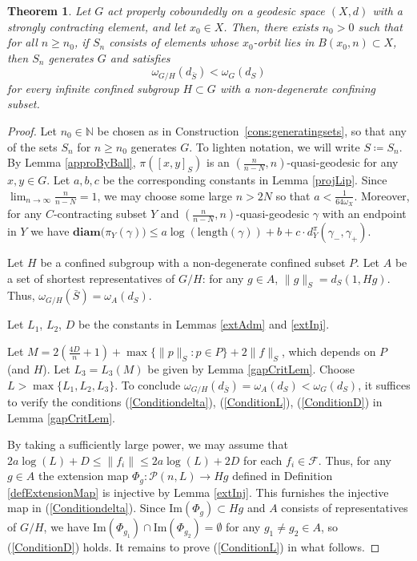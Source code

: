 \documentclass{amsart}
\newtheorem{thm}{Theorem}
\numberwithin{thm}{section}
\numberwithin{figure}{section}
\theoremstyle{definition}
\theoremstyle{definition}
\theoremstyle{remark}
\newcommand{\diam }[1]{{\textbf{diam}\big(#1\big)}}
\numberwithin{equation}{section}
\theoremstyle{plain}
\begin{document}
\begin{thm}\label{thm:main_growth}
Let $G$ act properly coboundedly on a geodesic space $(X,d)$ with a strongly contracting element, and let $x_0 \in X$. Then, there exists $n_0 > 0$ such that for all $n \geq n_0$, if $S_n$ consists of elements whose $x_0$-orbit lies in $B(x_0,n) \subset X$, then $S_n$ generates $G$ and satisfies 
\[
\omega_{G/H}(d_{\bar{S}}) < \omega_G(d_S)
\]
for \emph{every} infinite confined subgroup $H \subset G$ with a non-degenerate confining subset.
\end{thm}
\begin{proof}
    Let $n_0 \in \mathbb{N}$ be chosen as in Construction~\ref{cons:generatingsets}, so that any of the sets $S_n$ for $n \geq n_0$ generates $G$.
    To lighten notation, we will  write $S \coloneqq S_n$.
	By Lemma \ref{approByBall}, $\pi([x, y]_S)$ is an $(\frac{n}{n-N}, n)$-quasi-geodesic for any $x,y\in G$.  Let $a, b, c$ be the corresponding constants in Lemma \ref{projLip}. Since $\lim_{n\to \infty} \frac{n}{n-N} = 1$, we may choose    some large $n > 2N$ so that   $a < \frac{1}{64\omega_X}$. Moreover, for any $C$-contracting subset $Y$ and $(\frac{n}{n-N}, n)$-quasi-geodesic $\gamma$ with an endpoint in $Y$ we have $\diam{\pi_Y(\gamma)} \le a \log(\mathrm{length}(\gamma)) + b + c \cdot d^{\pi}_Y(\gamma_-, \gamma_+)$.
	
	Let $H$ be a confined subgroup with a non-degenerate confined subset $P$. Let $A$ be a set of shortest representatives of $G/H$: for any $g\in A$, $\|g\|_S=d_S(1,Hg)$. Thus, $\omega_{G/H}(\bar{S}) = \omega_A(d_{S})$. 
	
	Let $L_1$, $L_2$, $D$ be the constants in Lemmas \ref{extAdm} and \ref{extInj}.
	
	Let $M = 2(\frac{4D}{n} + 1) + \max\{\|p\|_S:p\in P\} + 2\|f\|_S$, which depends on $P$ (and $H$). 
	Let $L_3 =L_3(M)$ be given by Lemma \ref{gapCritLem}. Choose $L > \max\{L_1, L_2, L_3\}$. To conclude  $\omega_{G/H}(d_{\bar{S}}) = \omega_A(d_{S}) < \omega_G(d_{S})$, it suffices to verify the conditions (\ref{Conditiondelta}), (\ref{ConditionL}), (\ref{ConditionD}) in Lemma \ref{gapCritLem}.
	
	By taking a sufficiently large power, we may assume that $2a \log(L) + D \le \|f_i\| \le 2a \log(L) + 2D$ for each $f_i\in \mathcal{F}$.
	Thus, for any $g\in A$  the extension map $\Phi_g: \mathcal{P}(n, L) \to Hg$  defined in Definition \ref{defExtensionMap} is injective by Lemma \ref{extInj}. This furnishes the injective map in (\ref{Conditiondelta}). Since $\mathrm{Im}(\Phi_g) \subset Hg$ and $A$ consists of representatives of $G/H$, we have $\mathrm{Im}(\Phi_{g_1})\cap \mathrm{Im}(\Phi_{g_2}) = \emptyset$ for any $g_1\ne g_2\in A$, so  (\ref{ConditionD}) holds. It remains to prove (\ref{ConditionL}) in what follows. 
	

\end{proof}
\end{document}
